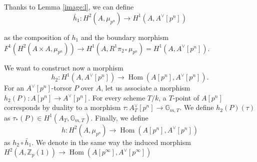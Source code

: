 \documentclass[11pt]{amsart}
\newcommand{\spa}{\medskip}
\newcommand{\Zp}{{\mathbb{Z}_{p}}}
\DeclareMathOperator{\Hom}{Hom}
\newcommand{\mupn}{{\mu_{p^n}}}
\begin{document}
\subsection{}
Thanks to Lemma \ref{image:l}, we can define $$\bar{h}_1: H^2(A,\mupn)\to H^1(A,A^\vee[p^n])$$

as the composition of $h_1$ and the boundary morphism $F^1(H^2(A\times A,\mupn))\to H^1(A,R^1\pi_{2*}\mupn)=H^1(A,A^\vee[p^n])$.

\spa

We want to construct now a morphism $$h_2:H^1(A, A^\vee[p^n])\to\Hom(A[p^n],A^\vee[p^n]).$$ For an $A^\vee[p^n]$-torsor $P$ over $A$, let us associate a morphism $h_2(P): A[p^n]\to A^\vee[p^n]$. For every scheme $T/k$, a $T$-point of $A[p^n]$ corresponds by duality to a morphism $\tau: A_T^\vee[p^n]\to \mathbb{G}_{m,T}$. We define $h_2(P)(\tau)$ as $\tau_*(P)\in H^1(A_T,\mathbb{G}_{m,T})$. Finally, we define $$h: H^2(A,\mupn)\to \Hom(A[p^n],A^\vee[p^n])$$ as ${h_2}\circ\bar{h}_1$. We denote in the same way the induced morphism $H^2(A,\Zp(1))\to \Hom(A[p^\infty],A^\vee[p^\infty])$
\end{document}
